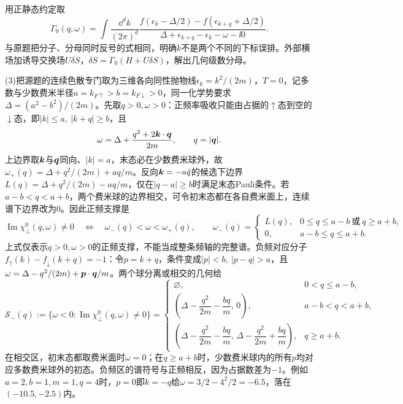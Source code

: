 \begin{solution}
用正静态约定取
\begin{equation}
\Gamma_0(q,\omega)=\int\frac{\dd^dk}{(2\pi)^d}\frac{f(\epsilon_k-\Delta/2)-f(\epsilon_{k+q}+\Delta/2)}{\Delta+\epsilon_{k+q}-\epsilon_k-\omega-\ii0}.
\end{equation}
与原题把分子、分母同时反号的式相同，明确$k$不是两个不同的下标误排。外部横场加诱导交换场$U\delta S$，$\delta S=\Gamma_0(H+U\delta S)$，解出几何级数分母。

(3)把源题的连续色散专门取为三维各向同性抛物线$\epsilon_k=k^2/(2m)$，$T=0$，记多数与少数费米半径$a=k_{F\uparrow}>b=k_{F\downarrow}>0$，同一化学势要求$\Delta=(a^2-b^2)/(2m)$。先取$q>0,\omega>0$：正频率吸收只能由占据的$\uparrow$态到空的$\downarrow$态，即$|k|\le a,\ |k+q|\ge b$，且
\begin{equation}
\omega=\Delta+\frac{q^2+2\boldsymbol{k}\cdot\boldsymbol{q}}{2m},\qquad q=|\boldsymbol{q}|.
\end{equation}
上边界取$\boldsymbol{k}$与$\boldsymbol{q}$同向、$|k|=a$，末态必在少数费米球外，故$\omega_+(q)=\Delta+q^2/(2m)+aq/m$。反向$\boldsymbol{k}=-a\hat q$的候选下边界$L(q)=\Delta+q^2/(2m)-aq/m$，仅在$|q-a|\ge b$时满足末态Pauli条件。若$a-b<q<a+b$，两个费米球的边界相交，可令初末态都在各自费米面上，连续谱下边界改为0。因此正频支撑是
\begin{equation}
\operatorname{Im}\chi^0_\perp(q,\omega)\ne0\quad\Longleftrightarrow\quad
\omega_-(q)<\omega<\omega_+(q),\qquad
\omega_-(q)=\begin{cases}
L(q),&0\le q\le a-b\ \text{或}\ q\ge a+b,\\
0,&a-b\le q\le a+b.
\end{cases}
\end{equation}
上式仅表示$q>0,\omega>0$的正频支撑，不能当成整条频轴的完整谱。负频对应分子$f_\uparrow(k)-f_\downarrow(k+q)=-1$：令$p=k+q$，条件变成$|p|<b,\ |p-q|>a$，且$\omega=\Delta-q^2/(2m)+\boldsymbol{p}\cdot\boldsymbol{q}/m$。两个球分离或相交的几何给
\begin{equation}
\mathcal S_-(q):=\{\omega<0:\operatorname{Im}\chi^0_\perp(q,\omega)\ne0\}
=
\begin{cases}
\varnothing,&0<q\le a-b,\\
\left(\Delta-\dfrac{q^2}{2m}-\dfrac{bq}{m},\,0\right),&a-b<q<a+b,\\
\left(\Delta-\dfrac{q^2}{2m}-\dfrac{bq}{m},\,
\Delta-\dfrac{q^2}{2m}+\dfrac{bq}{m}\right),&q\ge a+b.
\end{cases}
\end{equation}
在相交区，初末态都取费米面时$\omega=0$；在$q\ge a+b$时，少数费米球内的所有$p$均对应多数费米球外的初态。负频区的谱符号与正频相反，因为占据数差为$-1$。例如$a=2,b=1,m=1,q=4$时，$p=0$即$k=-q$给$\omega=3/2-4^2/2=-6.5$，落在$(-10.5,-2.5)$内。


\end{solution}
